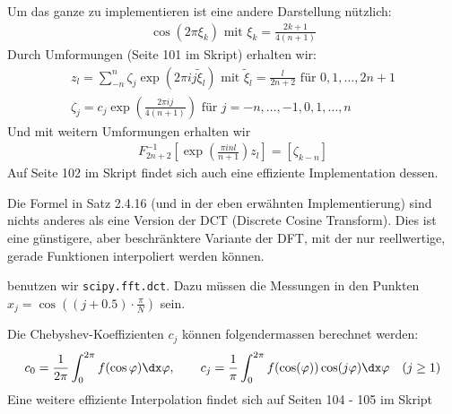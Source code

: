 Um das ganze zu implementieren ist eine andere Darstellung nützlich:
\begin{align*}
    \cos(2\pi \xi_k) \text{ mit } \xi_k = \frac{2k + 1}{4(n + 1)}
\end{align*}
Durch Umformungen (Seite 101 im Skript) erhalten wir:
\begin{align*}
    z_l = \sum_{-n}^{n} \zeta_j \exp\left( 2\pi ij \tilde{\xi}_l \right) \text{ mit } \tilde{\xi}_l = \frac{l}{2n + 2} \text{ für } 0, 1, \ldots, 2n + 1\\
    \zeta_j = c_j \exp\left( \frac{2 \pi ij}{4(n + 1)} \right) \text{ für } j = -n, \ldots, -1, 0, 1, \ldots, n
\end{align*}
Und mit weitern Umformungen erhalten wir
\begin{align*}
    F^{-1}_{2n + 2} \left[ \exp\left( \frac{\pi inl}{n + 1} \right) z_l \right] = [\zeta_{k -n}]
\end{align*}
Auf Seite 102 im Skript findet sich auch eine effiziente Implementation dessen.

\inlineremark Die Formel in Satz 2.4.16 (und in der eben erwähnten Implementierung) sind nichts anderes als eine Version der DCT (Discrete Cosine Transform).
Dies ist eine günstigere, aber beschränktere Variante der DFT, mit der nur reellwertige, gerade Funktionen interpoliert werden können.

\innumpy benutzen wir \texttt{scipy.fft.dct}. Dazu müssen die Messungen in den Punkten $x_j = \cos\left( (j + 0.5) \cdot \frac{\pi}{N} \right)$ sein.

\inlineremark Die Chebyshev-Koeffizienten $c_j$ können folgendermassen berechnet werden:
\rmvspace
\begin{align*}
    c_0 = \frac{1}{2\pi}\int_0^{2\pi} f(\cos\varphi)\dx\varphi,\qquad
    c_j = \frac{1}{\pi} \int_{0}^{2\pi} f(\cos(\varphi)) \cos(j \varphi) \dx \varphi\quad(j\geq1)
\end{align*}
Eine weitere effiziente Interpolation findet sich auf Seiten 104 - 105 im Skript
